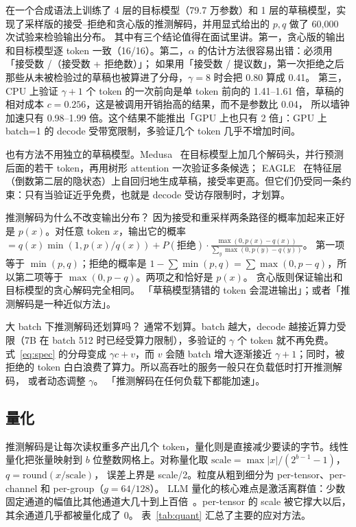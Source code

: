 在一个合成语法上训练了 4 层的目标模型（79.7 万参数）和 1 层的草稿模型，实现了采样版的接受--拒绝和贪心版的推测解码，并用显式给出的 $p,q$ 做了 60,000 次试验来检验输出分布。
其中有三个结论值得在面试里讲。第一，贪心版的输出和目标模型逐 token 一致（16/16）。第二，$\alpha$ 的估计方法很容易出错：必须用「接受数 /（接受数 + 拒绝数）」；
如果用「接受数 / 提议数」，第一次拒绝之后那些从未被检验过的草稿也被算进了分母，$\gamma=8$ 时会把 0.80 算成 0.41。
第三，CPU 上验证 $\gamma+1$ 个 token 的一次前向是单 token 前向的 1.41--1.61 倍，草稿的相对成本 $c=0.256$，这是被调用开销抬高的结果，而不是参数比 0.04，
所以墙钟加速只有 0.98--1.99 倍。这个结果不能推出「GPU 上也只有 2 倍」：GPU 上 batch=1 的 decode 受带宽限制，多验证几个 token 几乎不增加时间。

也有方法不用独立的草稿模型。Medusa~\cite{cai2024medusa} 在目标模型上加几个解码头，并行预测后面的若干 token，再用树形 attention 一次验证多条候选；
EAGLE~\cite{li2024eagle} 在特征层（倒数第二层的隐状态）上自回归地生成草稿，接受率更高。但它们仍受同一条约束：只有当验证近乎免费，也就是 decode 受访存限制时，才划算。

\begin{qa}{推测解码为什么不改变输出分布？}
\ans 因为接受和重采样两条路径的概率加起来正好是 $p(x)$。对任意 token $x$，输出它的概率 $=q(x)\min(1,p(x)/q(x))+P(\text{拒绝})\cdot\frac{\max(0,p(x)-q(x))}{\sum_y\max(0,p(y)-q(y))}$。
第一项等于 $\min(p,q)$；拒绝的概率是 $1-\sum\min(p,q)=\sum\max(0,p-q)$，所以第二项等于 $\max(0,p-q)$。两项之和恰好是 $p(x)$。
贪心版则保证输出和目标模型的贪心解码完全相同。
\wrong 「草稿模型猜错的 token 会混进输出」；或者「推测解码是一种近似方法」。
\end{qa}

\begin{qa}{大 batch 下推测解码还划算吗？}
\ans 通常不划算。batch 越大，decode 越接近算力受限（7B 在 batch 512 时已经受算力限制），多验证的 $\gamma$ 个 token 就不再免费。
式~\eqref{eq:spec} 的分母变成 $\gamma c+v$，而 $v$ 会随 batch 增大逐渐接近 $\gamma+1$；同时，被拒绝的 token 白白浪费了算力。所以高吞吐的服务一般只在负载低时打开推测解码，
或者动态调整 $\gamma$。
\wrong 「推测解码在任何负载下都能加速」。
\end{qa}

\subsection{量化}

推测解码是让每次读权重多产出几个 token，量化则是直接减少要读的字节。线性量化把张量映射到 $b$ 位整数网格上。对称量化取 $\text{scale}=\max|x|/(2^{b-1}-1)$，$q=\mathrm{round}(x/\text{scale})$，
误差上界是 scale/2。粒度从粗到细分为 per-tensor、per-channel 和 per-group（$g=64/128$）。
LLM 量化的核心难点是激活离群值：少数固定通道的幅值比其他通道大几十到上百倍~\cite{dettmers2022llmint8}。per-tensor 的 scale 被它撑大以后，其余通道几乎都被量化成了 0。
表~\ref{tab:quant} 汇总了主要的应对方法。

